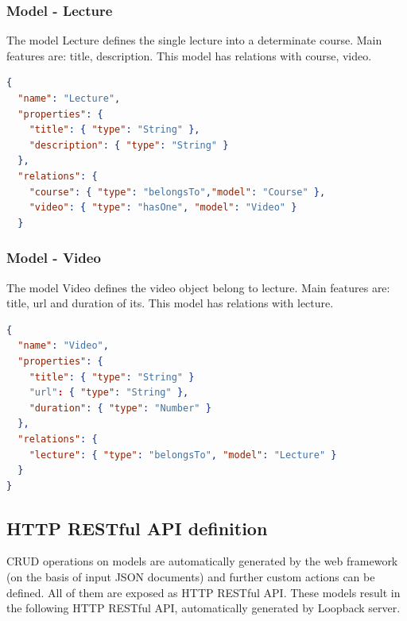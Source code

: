 \subsubsection{ Model - Lecture}

The model Lecture defines the single lecture into a determinate course. Main features are: title, description. This model has relations with course, video.


\begin{lstlisting}[language=json]
{
  "name": "Lecture",
  "properties": {
    "title": { "type": "String" },
    "description": { "type": "String" }
  },
  "relations": {
    "course": { "type": "belongsTo","model": "Course" },
    "video": { "type": "hasOne", "model": "Video" }
  }

\end{lstlisting}

\subsubsection{ Model - Video}

The model Video defines the video object belong to lecture. Main features are: title, url and duration of its. This model has relations with lecture.


\begin{lstlisting}[language=json]
{
  "name": "Video",
  "properties": {
    "title": { "type": "String" }
    "url": { "type": "String" },
    "duration": { "type": "Number" }
  },
  "relations": {
    "lecture": { "type": "belongsTo", "model": "Lecture" }
  }
}

\end{lstlisting}


\subsection {HTTP RESTful API definition}
\label{subsec:HTTP_RESTful_API_definition}

CRUD operations on models are automatically generated by the web framework (on the basis of input JSON documents) and further custom actions can be defined. All of them are exposed as HTTP RESTful API.
These models result in the following HTTP RESTful API, automatically generated by Loopback server.


